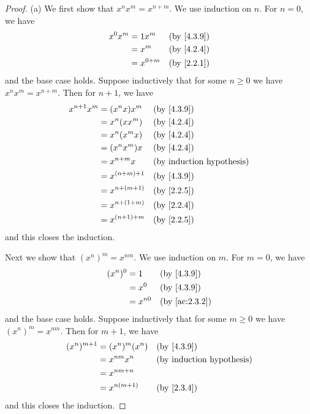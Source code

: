\begin{proof}{(a)}
  We first show that \(x^n x^m = x^{n + m}\).
  We use induction on \(n\).
  For \(n = 0\), we have
  \begin{align*}
    x^0 x^m & = 1 x^m     &  & \by{4.3.9} \\
            & = x^m       &  & \by{4.2.4} \\
            & = x^{0 + m} &  & \by{2.2.1}
  \end{align*}
  and the base case holds.
  Suppose inductively that for some \(n \geq 0\) we have \(x^n x^m = x^{n + m}\).
  Then for \(n + 1\), we have
  \begin{align*}
    x^{n + 1} x^m & = (x^n x) x^m     &  & \by{4.3.9} \\
                  & = x^n (x x^m)     &  & \by{4.2.4} \\
                  & = x^n (x^m x)     &  & \by{4.2.4} \\
                  & = (x^n x^m) x     &  & \by{4.2.4} \\
                  & = x^{n + m} x     &  & \byIH      \\
                  & = x^{(n + m) + 1} &  & \by{4.3.9} \\
                  & = x^{n + (m + 1)} &  & \by{2.2.5} \\
                  & = x^{n + (1 + m)} &  & \by{2.2.4} \\
                  & = x^{(n + 1) + m} &  & \by{2.2.5}
  \end{align*}
  and this closes the induction.

  Next we show that \((x^n)^m = x^{nm}\).
  We use induction on \(m\).
  For \(m = 0\), we have
  \begin{align*}
    (x^n)^0 & = 1      &  & \by{4.3.9}                  \\
            & = x^0    &  & \by{4.3.9}                  \\
            & = x^{n0} &  & \text{(by \cref{ac:2.3.2})}
  \end{align*}
  and the base case holds.
  Suppose inductively that for some \(m \geq 0\) we have \((x^n)^m = x^{nm}\).
  Then for \(m + 1\), we have
  \begin{align*}
    (x^n)^{m + 1} & = (x^n)^m (x^n) &  & \by{4.3.9} \\
                  & = x^{nm} x^n    &  & \byIH      \\
                  & = x^{nm + n}                    \\
                  & = x^{n(m + 1)}  &  & \by{2.3.4}
  \end{align*}
  and this closes the induction.


\end{proof}
